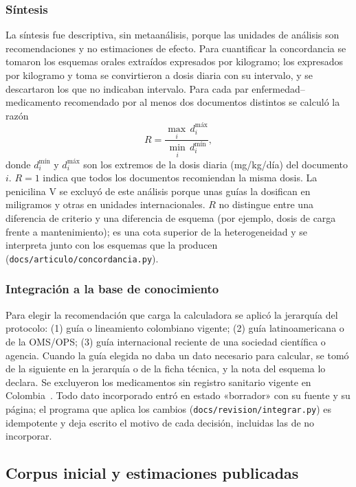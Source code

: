 \documentclass[11pt,a4paper]{article}
\newcommand{\codigo}[1]{\texttt{\small #1}}
\begin{document}
\subsubsection{Síntesis}

La síntesis fue descriptiva, sin metaanálisis, porque las unidades de análisis son recomendaciones y no estimaciones de efecto. Para cuantificar la concordancia se tomaron los esquemas orales extraídos expresados por kilogramo; los expresados por kilogramo y toma se convirtieron a dosis diaria con su intervalo, y se descartaron los que no indicaban intervalo. Para cada par enfermedad--medicamento recomendado por al menos dos documentos distintos se calculó la razón
\begin{equation}
R = \frac{\max_i \, d_i^{\text{máx}}}{\min_i \, d_i^{\text{mín}}},
\label{eq:razon}
\end{equation}
donde $d_i^{\text{mín}}$ y $d_i^{\text{máx}}$ son los extremos de la dosis diaria (mg/kg/día) del documento $i$. $R = 1$ indica que todos los documentos recomiendan la misma dosis. La penicilina V se excluyó de este análisis porque unas guías la dosifican en miligramos y otras en unidades internacionales. $R$ no distingue entre una diferencia de criterio y una diferencia de esquema (por ejemplo, dosis de carga frente a mantenimiento); es una cota superior de la heterogeneidad y se interpreta junto con los esquemas que la producen (\codigo{docs/articulo/concordancia.py}).

\subsubsection{Integración a la base de conocimiento}

Para elegir la recomendación que carga la calculadora se aplicó la jerarquía del protocolo: (1) guía o lineamiento colombiano vigente; (2) guía latinoamericana o de la OMS/OPS; (3) guía internacional reciente de una sociedad científica o agencia. Cuando la guía elegida no daba un dato necesario para calcular, se tomó de la siguiente en la jerarquía o de la ficha técnica, y la nota del esquema lo declara. Se excluyeron los medicamentos sin registro sanitario vigente en Colombia~\citep{invima}. Todo dato incorporado entró en estado «borrador» con su fuente y su página; el programa que aplica los cambios (\codigo{docs/revision/integrar.py}) es idempotente y deja escrito el motivo de cada decisión, incluidas las de no incorporar.

\subsection{Corpus inicial y estimaciones publicadas}
\end{document}
